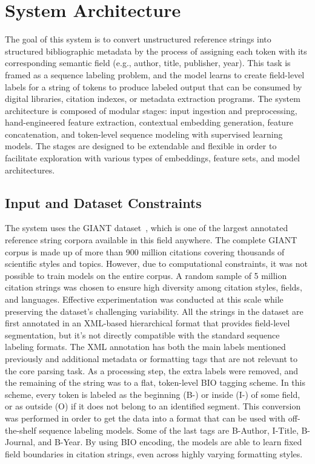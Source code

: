 \section{System Architecture}
The goal of this system is to convert unstructured reference strings into structured bibliographic metadata by the process of assigning each token with its corresponding semantic field (e.g., author, title, publisher, year). This task is framed as a sequence labeling problem, and the model learns to create field-level labels for a string of tokens to produce labeled output that can be consumed by digital libraries, citation indexes, or metadata extraction programs.
The system architecture is composed of modular stages: input ingestion and preprocessing, hand-engineered feature extraction, contextual embedding generation, feature concatenation, and token-level sequence modeling with supervised learning models. The stages are designed to be extendable and flexible in order to facilitate exploration with various types of embeddings, feature sets, and model architectures.

\subsection{Input and Dataset Constraints}
The system uses the GIANT dataset~\cite{giant}, which is one of the largest annotated reference string corpora available in this field anywhere. The complete GIANT corpus is made up of more than 900 million citations covering thousands of scientific styles and topics. However, due to computational constraints, it was not possible to train models on the entire corpus. A random sample of 5 million citation strings was chosen to ensure high diversity among citation styles, fields, and languages. Effective experimentation was conducted at this scale while preserving the dataset’s challenging variability.
All the strings in the dataset are first annotated in an XML-based hierarchical format that provides field-level segmentation, but it’s not directly compatible with the standard sequence labeling formats. The XML annotation has both the main labels mentioned previously and additional metadata or formatting tags that are not relevant to the core parsing task. As a processing step, the extra labels were removed, and the remaining of the string was to a flat, token-level BIO tagging scheme. In this scheme, every token is labeled as the beginning (B-) or inside (I-) of some field, or as outside (O) if it does not belong to an identified segment. This conversion was performed in order to get the data into a format that can be used with off-the-shelf sequence labeling models. Some of the last tags are B-Author, I-Title, B-Journal, and B-Year. By using BIO encoding, the models are able to learn fixed field boundaries in citation strings, even across highly varying formatting styles.


